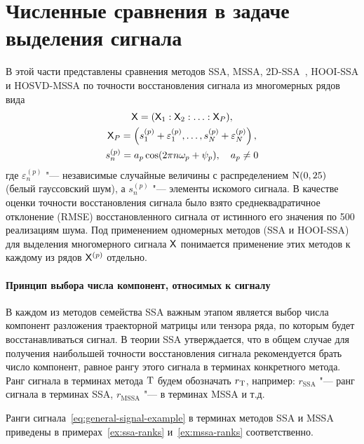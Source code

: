 \documentclass[specialist,
    substylefile = spbu.rtx,
    subf,href,colorlinks=true, 12pt]{disser}
\theoremstyle{plain}
\theoremstyle{definition}
\theoremstyle{remark}
\begin{document}
    \section{Численные сравнения в задаче выделения сигнала}\label{sec:numerical-compar}
    В этой части представлены сравнения методов SSA, MSSA, 2D-SSA~\cite{2d-ssa}, HOOI-SSA и HOSVD-MSSA
    по точности восстановления сигнала из многомерных рядов вида
    \begin{gather}
        \mathsf{X} = (\mathsf{X}_1: \mathsf{X}_2 : \ldots: \mathsf{X}_P), \nonumber \\
        \mathsf{X}_P = \left(s_1^{(p)} + \varepsilon_1^{(p)}, \ldots, s_N^{(p)} + \varepsilon_N^{(p)}\right),\nonumber \\
        s_n^{(p)} = a_p \cos(2\pi n \omega_p + \psi_p), \quad a_p \ne 0 \label{eq:general-signal-example}
    \end{gather}
    где $\varepsilon_n^{(p)}$ "--- независимые случайные величины с распределением $\mathrm{N}(0, 25)$
    (белый гауссовский шум), а $s_n^{(p)}$ "--- элементы искомого сигнала.
    В качестве оценки точности восстановления сигнала было взято среднеквадратичное отклонение (RMSE)
    восстановленного сигнала от истинного его значения по 500 реализациям шума.
    Под применением одномерных методов (SSA и HOOI-SSA) для выделения многомерного сигнала $\mathsf{X}$ понимается
    применение этих методов к каждому из рядов $\mathsf{X}^{(p)}$ отдельно.

    \paragraph{Принцип выбора числа компонент, относимых к сигналу}\label{subsec:example-signal-ranks}
    В каждом из методов семейства SSA важным этапом является выбор числа компонент разложения траекторной матрицы
    или тензора ряда, по которым будет восстанавливаться сигнал.
    В теории SSA утверждается, что в общем случае для получения наибольшей точности восстановления
    сигнала рекомендуется брать число компонент, равное рангу этого сигнала в терминах конкретного метода.
    Ранг сигнала в терминах метода $\mathrm{T}$ будем обозначать $r_{\mathrm{T}}$, например: $r_\text{SSA}$ "---
    ранг сигнала в терминах SSA, $r_\text{MSSA}$ "--- в терминах MSSA и т.д.

    Ранги сигнала~\eqref{eq:general-signal-example} в терминах методов SSA и MSSA приведены в
    примерах~\ref{ex:ssa-ranks} и~\ref{ex:mssa-ranks} соответственно.
\end{document}
